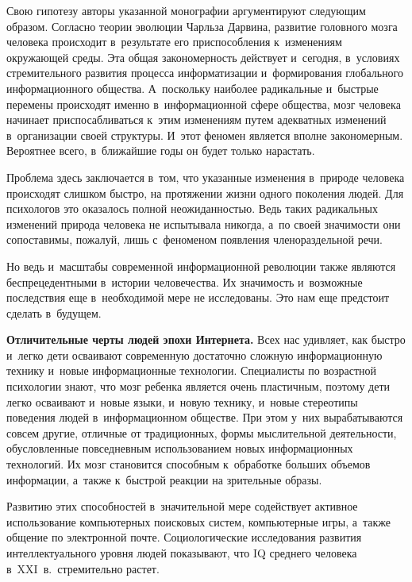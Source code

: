 \begin{multicols}{2}
    Свою гипотезу авторы указанной монографии аргументируют 
следующим образом. Согласно тео\-рии эволюции Чарльза Дарвина, развитие 
головного мозга человека происходит в~результате его приспособления 
к~изменениям окружающей среды. Эта общая закономерность действует 
и~сегодня, в~условиях стремительного развития процесса информатизации 
и~формирования глобального информационного общества. А~поскольку 
наиболее радикальные и~быстрые перемены происходят именно 
в~информационной сфере общества, мозг человека начинает 
приспосабливаться к~этим изменениям путем адекватных изменений 
в~организации своей структуры. И~этот феномен является вполне 
закономерным. Вероятнее всего, в~ближайшие годы он будет только 
нарастать.
    
    Проблема здесь заключается в~том, что указанные изменения в~природе 
человека происходят слишком быстро, на протяжении жизни одного 
поколения людей. Для психологов это оказалось полной неожиданностью. 
Ведь таких радикальных изменений природа человека не испытывала 
никогда, а~по своей значимости они сопоставимы, пожалуй, лишь 
с~феноменом появления членораздельной речи. 
    
    Но ведь и~масштабы современной информационной революции также 
являются беспрецедентными в~истории человечества. Их значимость 
и~возможные последствия еще в~необходимой мере не исследованы. Это нам 
еще предстоит сделать в~будущем. 
    
    \textbf{Отличительные черты людей эпохи Интернета.} Всех нас 
удивляет, как быстро и~легко дети осваивают современную достаточно 
сложную информационную технику и~новые информационные технологии. 
Специалисты по возрастной психологии знают, что мозг ребенка является 
очень пластичным, поэтому дети легко осваивают и~новые языки, и~новую 
технику, и~новые стереотипы поведения людей в~информационном обществе. 
При этом у~них вырабатываются совсем другие, отличные от традиционных, 
формы мыслительной дея\-тель\-ности, обусловленные повседневным 
использованием новых информационных технологий. Их мозг становится 
способным к~обработке больших объемов информации, а~также к~быстрой 
реакции на зрительные образы. 
    
    Развитию этих способностей в~значительной мере содействует активное 
использование компьютерных поисковых систем, компьютерные игры, 
а~также общение по электронной почте. Социологические исследования 
развития интеллектуального уровня людей показывают, что IQ среднего 
человека в~XXI~в.\ стремительно растет. 
    

\end{multicols}
